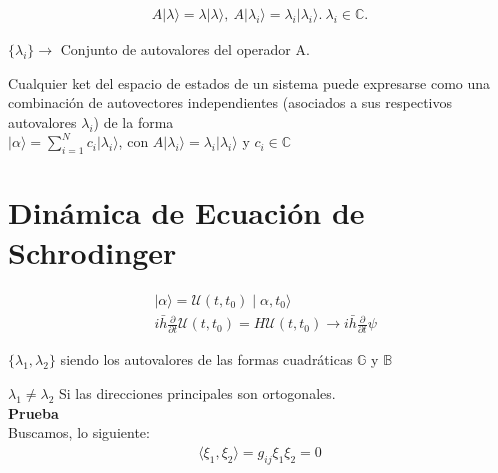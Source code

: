 \documentclass[a4,12pt]{aleph-notas}
\begin{document}
\begin{align*}
    A \vert \lambda \rangle = \lambda \vert \lambda \rangle, \ A\vert\lambda_i\rangle= \lambda_i\vert\lambda_i\rangle. \ \lambda_i \in \mathbb{C}.
\end{align*}

\begin{center}
    $\{ \lambda_i\} \rightarrow$ Conjunto de autovalores del operador A. 
\end{center}

Cualquier ket del espacio de estados de un sistema puede expresarse como una combinación de autovectores independientes (asociados a sus respectivos autovalores {$\lambda_i$}) de la forma\\

$\vert \alpha \rangle = \sum_{i=1}^{N} c_i \vert \lambda_i \rangle$, con $A \vert\lambda_i\rangle=\lambda_i\vert\lambda_i\rangle$ y $c_i \in \mathbb{C}$


\vspace*{-8mm}
\section{Dinámica de Ecuación de Schrodinger}


\begin{align*}
    &\mid \alpha \rangle = \mathcal{U}(t,t_0) \mid \alpha,t_0 \rangle\\
    &i \bar{h}\frac{\partial}{\partial t} \mathcal{U}(t,t_0) =H\mathcal{U}(t,t_0) \rightarrow i \bar{h} \frac{\partial}{\partial t}\psi
\end{align*}

$\{ \lambda_1, \lambda_2 \}$ siendo los autovalores de las formas cuadráticas $\mathbb{G}$ y $\mathbb{B}$

\begin{lem}$\lambda_1 \neq \lambda_2$ Si las direcciones principales son ortogonales.\\
    \large{\textbf{Prueba}}\\
    Buscamos, lo siguiente:
    \begin{align*}
        \langle \xi_1, \xi_2 \rangle=g_{ij}\xi_1 \xi_2=0
    \end{align*}

\end{lem}
\end{document}
